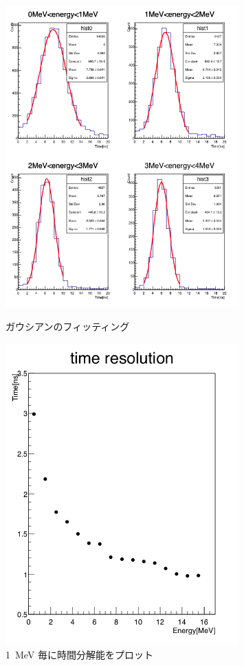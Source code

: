 \begin{figure}[H]%
\begin{minipage}{0.5\hsize}
\centering
\includegraphics[width  = 0.8\textwidth]{figure/mino/gausfitting_ratio.png}
\caption{ガウシアンのフィッティング}
\label{fig:NaI_peak_gaus_fitting}
\end{minipage}
\begin{minipage}{0.5\hsize}
\centering
\includegraphics[width  = 0.8\textwidth]{figure/mino/timeresolution_ratio.png}
\caption{1~MeV 毎に時間分解能をプロット}
\label{fig:NaI_peak_time_resolution}
\end{minipage}
\end{figure}


